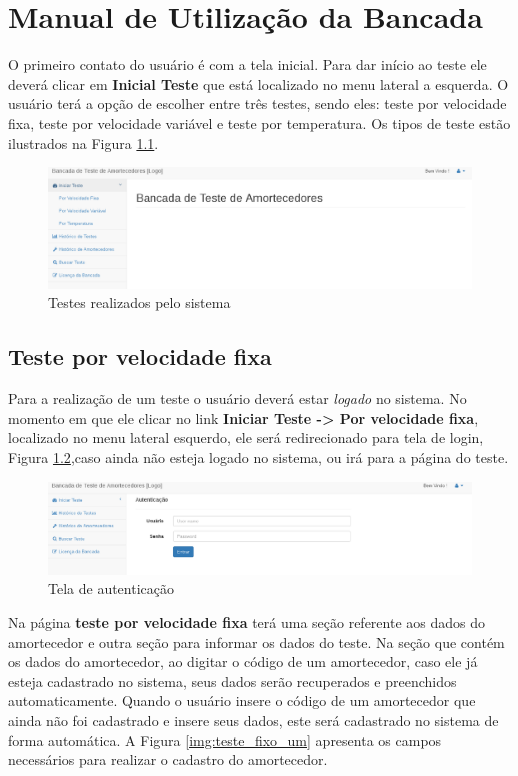 \chapter{Manual de Utilização da Bancada}

O primeiro contato do usuário é com a tela inicial. Para dar início ao teste ele deverá clicar em \textbf{Inicial Teste} que está localizado no menu lateral a esquerda. O usuário terá a opção de escolher entre três testes, sendo eles: teste por velocidade fixa, teste por velocidade variável e teste por temperatura. Os tipos de teste estão ilustrados na Figura \ref{img:testes}.

\begin{figure}[h]
	\centering
	\label{img:testes}
		\includegraphics[width=1\textwidth]{figuras/testes.eps}
	\caption{Testes realizados pelo sistema}
\end{figure}

\section{Teste por velocidade fixa}

Para a realização de um teste o usuário deverá estar \textit{logado} no sistema. No momento em que ele clicar no link \textbf{Iniciar Teste -> Por velocidade fixa}, localizado no menu lateral esquerdo, ele será redirecionado para tela de login, Figura \ref{img:login},caso ainda não esteja logado no sistema, ou irá para a página do teste. 

\begin{figure}[h]
	\centering
	\label{img:login}
		\includegraphics[width=1\textwidth]{figuras/login.eps}
	\caption{Tela de autenticação}
\end{figure}


Na página \textbf{teste por velocidade fixa} terá uma seção referente aos dados do amortecedor e outra seção para informar os dados do teste. Na seção que contém os dados do amortecedor, ao digitar o código de um amortecedor, caso ele já esteja cadastrado no sistema, seus dados serão recuperados e preenchidos automaticamente. Quando o usuário insere o código de um amortecedor que ainda não foi cadastrado e insere seus dados, este será cadastrado no sistema de forma automática. A Figura \ref{img:teste_fixo_um} apresenta os campos necessários para realizar o cadastro do amortecedor.

